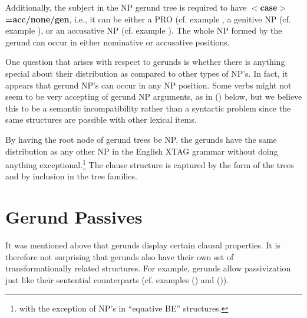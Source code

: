 Additionally, the subject in the NP gerund tree is required to have {\bf
$<$case$>$=acc/none/gen}, i.e., it can be either a PRO (cf. example
, a genitive NP (cf. example ), or an accusative NP
(cf. example ). The whole NP formed by the gerund can occur in either
nominative or accusative positions.\\




One question that arises with respect to gerunds is whether there is anything
special about their distribution as compared to other types of NP's.  In fact,
it appears that gerund NP's can occur in any NP position.  Some verbs might not
seem to be very accepting of gerund NP arguments, as in () below, but we
believe this to be a semantic incompatibility rather than a syntactic problem
since the same structures are possible with other lexical items.


By having the root node of gerund trees be NP, the gerunds have the same
distribution as any other NP in the English XTAG grammar without doing
anything exceptional.\footnote{with the exception of NP's in ``equative
BE'' structures.} The clause structure is captured by the form of the trees
and by inclusion in the tree families.\\

\section{Gerund Passives}

It was mentioned above that gerunds display certain clausal properties. It
is therefore not surprising that gerunds also have their own set of
transformationally related structures. For example, gerunds allow
passivization just like their sentential counterparts (cf. examples
() and ()). 


